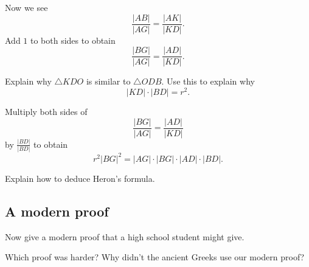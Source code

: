 \documentclass[nooutcomes]{ximera}
\begin{document}
\begin{question}
Now we see 
\[
\frac{|AB|}{|AG|} = \frac{|AK|}{|KD|}.
\]
Add $1$ to both sides to obtain
\[
\frac{|BG|}{|AG|} = \frac{|AD|}{|KD|}.
\]
\end{question}


\begin{question}
Explain why $\triangle KDO$ is similar to $\triangle ODB$. Use this to explain why
\[
|KD|\cdot|BD| = r^2.
\]
\end{question}

\begin{question}
Multiply both sides of 
\[
\frac{|BG|}{|AG|} = \frac{|AD|}{|KD|}
\]
by $\frac{|BD|}{|BD|}$ to obtain
\[
r^2|BG|^2 = |AG|\cdot |BG|\cdot |AD|\cdot |BD|.
\]
\end{question}


\begin{question}
Explain how to deduce Heron's formula.
\end{question}


\subsection*{A modern proof}

\begin{question}
Now give a modern proof that a high school student might give. 
\end{question}

\begin{question}
Which proof was harder? Why didn't the ancient Greeks use our modern
proof?
\end{question}
\end{document}
